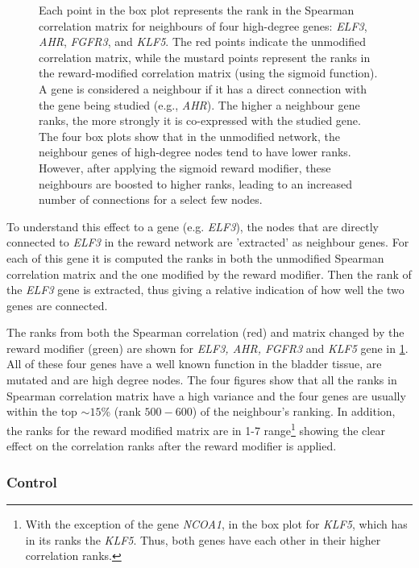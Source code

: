 \begin{figure}[!t]
    \caption[Spearman ranks of neighbour genes]{Each point in the box plot represents the rank in the Spearman correlation matrix for neighbours of four high-degree genes: \textit{ELF3}, \textit{AHR}, \textit{FGFR3}, and \textit{KLF5}. The red points indicate the unmodified correlation matrix, while the mustard points represent the ranks in the reward-modified correlation matrix (using the sigmoid function). A gene is considered a neighbour if it has a direct connection with the gene being studied (e.g., \textit{AHR}). The higher a neighbour gene ranks, the more strongly it is co-expressed with the studied gene. The four box plots show that in the unmodified network, the neighbour genes of high-degree nodes tend to have lower ranks. However, after applying the sigmoid reward modifier, these neighbours are boosted to higher ranks, leading to an increased number of connections for a select few nodes.}
    \label{fig:N_II:corr_analysis}
\end{figure}


To understand this effect to a gene (e.g. \textit{ELF3}), the nodes that are directly connected to \textit{ELF3} in the reward network are 'extracted' as neighbour genes. For each of this gene it is computed the ranks in both the unmodified Spearman correlation matrix and the one modified by the reward modifier. Then the rank of the \textit{ELF3} gene is extracted, thus giving a relative indication of how well the two genes are connected.

The ranks from both the Spearman correlation (red) and matrix changed  by the reward modifier (green) are shown for \textit{ELF3, AHR, FGFR3} and \textit{KLF5} gene in \cref{fig:N_II:corr_analysis}. All of these four genes have a well known function in the bladder tissue, are mutated and are high degree nodes. The four figures show that all the ranks in Spearman correlation matrix have a high variance and the four genes are usually within the top $\sim15$\% (rank $500-600$) of the neighbour's ranking. In addition, the ranks for the reward modified matrix are in 1-7 range\footnote{With the exception of the gene \textit{NCOA1}, in the box plot for \textit{KLF5}, which has in its ranks the \textit{KLF5}. Thus, both genes have each other in their higher correlation ranks.} showing the clear effect on the correlation ranks after the reward modifier is applied. 

\subsubsection*{Control} \label{s:N_II:ctrl_exp}


